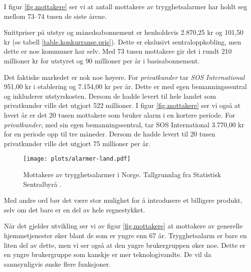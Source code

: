 I figur \vref{fig.mottakere} ser vi at antall mottakere av trygghetsalarmer har
holdt seg mellom 73--74 tusen de siste årene.  

Snittpriser på utstyr og månedsabonnement er henholdsvis 2.870,25 kr og 101,50
kr (se tabell \vref{table.konkurranse.pris}). Dette er ekslusivt
sentraloppkobling, men dette er noe kommuner har selv. Med 73 tusen mottakere
gir det i rundt 210 millioner kr for utstyret og 90 millioner per år i
basisabonnement. 

Det faktiske markedet er nok noe høyere. For \textit{privatkunder} tar
\textit{SOS International} 951,00 kr i etablering og 7.154,00 kr per år. Dette
er med egen bemanningssentral og inkluderer utstyrskosten. Dersom de hadde
levert til hele landet som privatkunder ville det utgjort 522 millioner.  I
figur \vref{fig.mottakere} ser vi også at hvert år er det 20 tusen mottakere
som bruker alarm i en kortere periode. For \textit{privatkunder}, med sin egen
bemanningssentral, tar SOS International 3.770,00 kr for en periode opp til tre
måneder.  Dersom de hadde levert til 20 tusen privatkunder ville det utgjort 75
millioner per år.

\begin{figure}
  \texttt{[image: plots/alarmer-land.pdf]}
  \caption{Mottakere av trygghetsalarmer i Norge.
    Tallgrunnlag fra Statistisk Sentralbyrå \cite{iplos.2013, ssb.trygghetsalarm}.}
  \label{fig.mottakere}
\end{figure}

Med andre ord bør det være stor mulighet for å introdusere et billigere
produkt, selv om det bare er en del av hele regnestykket.

Når det gjelder utvikling ser vi av figur \vref{fig.mottakere} at mottakere av
generelle hjemmetjenester øker blant de som er yngre enn 67 år. Trygghetsalarm
er bare en liten del av dette, men vi ser også at den yngre brukergruppen øker
noe. Dette er en yngre brukergruppe som kanskje er mer teknologivandte. De vil
da sannsynligvis ønske flere funksjoner.




